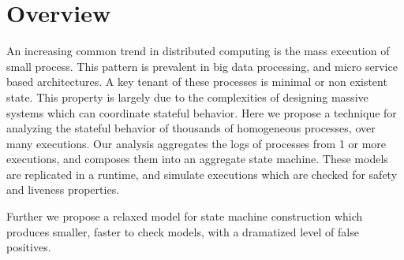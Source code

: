 \section{Overview}

An increasing common trend in distributed computing is the mass execution of
small process. This pattern is prevalent in big data processing, and micro
service based architectures. A key tenant of these processes is minimal or non
existent state. This property is largely due to the complexities of designing
massive systems which can coordinate stateful behavior. Here we propose a
technique for analyzing the stateful behavior of thousands of homogeneous
processes, over many executions. Our analysis aggregates the logs of processes
from 1 or more executions, and composes them into an aggregate state machine.
These models are replicated in a runtime, and simulate executions which are
checked for safety and liveness properties.

Further we propose a relaxed model for state machine construction which
produces smaller, faster to check models, with a dramatized level of false
positives.

